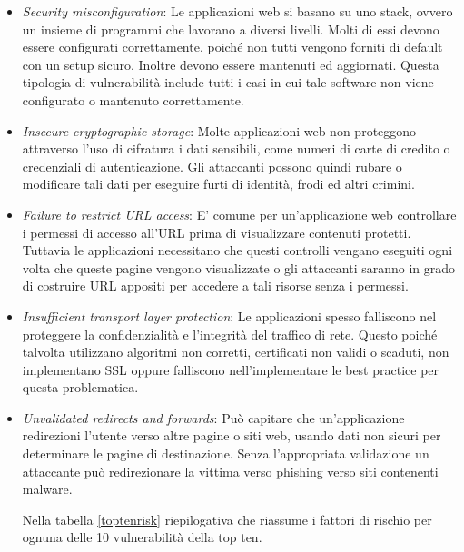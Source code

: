 \begin{itemize}
\item \emph{Security misconfiguration}: Le applicazioni web si basano su uno stack, ovvero un insieme di programmi che lavorano a diversi livelli. Molti di essi devono essere configurati correttamente, poiché non tutti vengono forniti di default con un setup sicuro. Inoltre devono essere mantenuti ed aggiornati. Questa tipologia di vulnerabilità include tutti i casi in cui tale software non viene configurato o mantenuto correttamente.
\item \emph{Insecure cryptographic storage}: Molte applicazioni web non proteggono attraverso l'uso di cifratura i dati sensibili, come numeri di carte di credito o credenziali di autenticazione. Gli attaccanti possono quindi rubare o modificare tali dati per eseguire furti di identità, frodi ed altri crimini.
\item \emph{Failure to restrict URL access}: E' comune per un'applicazione web controllare i permessi di accesso all'URL prima di visualizzare contenuti protetti. Tuttavia le applicazioni necessitano che questi controlli vengano eseguiti ogni volta che queste pagine vengono visualizzate o gli attaccanti saranno in grado di costruire URL appositi per accedere a tali risorse senza i permessi.
\item \emph{Insufficient transport layer protection}: Le applicazioni spesso falliscono nel proteggere la confidenzialità e l'integrità del traffico di rete. Questo poiché talvolta utilizzano algoritmi non corretti, certificati non validi o scaduti, non implementano SSL oppure falliscono nell'implementare le best practice per questa problematica.
\item \emph{Unvalidated redirects and forwards}: Può capitare che un'applicazione redirezioni l'utente verso altre pagine o siti web, usando dati non sicuri per determinare le pagine di destinazione. Senza l'appropriata validazione un attaccante può redirezionare la vittima verso phishing verso siti contenenti malware.

Nella tabella \ref{toptenrisk} riepilogativa che riassume i fattori di rischio per ognuna delle 10 vulnerabilità della top ten.


\end{itemize}
